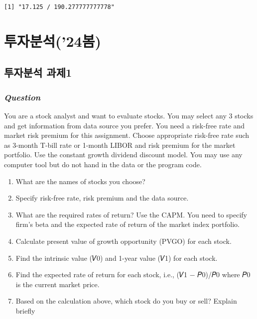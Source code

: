 \documentclass[
  letterpaper,
  DIV=11,
  numbers=noendperiod]{scrreprt}
\providecommand{\tightlist}{%
  \setlength{\itemsep}{0pt}\setlength{\parskip}{0pt}}\usepackage{longtable,booktabs,array}
\begin{document}
\begin{verbatim}
[1] "17.125 / 190.277777777778"
\end{verbatim}

\part{투자분석('24봄)}

\chapter*{투자분석 과제1}\label{uxd22cuxc790uxbd84uxc11d-uxacfcuxc81c1}


\section*{\texorpdfstring{\textbf{\emph{Question}}}{Question}}\label{question}


You are a stock analyst and want to evaluate stocks. You may select any
3 stocks and get information from data source you prefer. You need a
risk-free rate and market risk premium for this assignment. Choose
appropriate risk-free rate such as 3-month T-bill rate or 1-month LIBOR
and risk premium for the market portfolio. Use the constant growth
dividend discount model. You may use any computer tool but do not hand
in the data or the program code.

\begin{enumerate}
\def\labelenumi{\alph{enumi})}
\tightlist
\item
  What are the names of stocks you choose?
\item
  Specify risk-free rate, risk premium and the data source.
\item
  What are the required rates of return? Use the CAPM. You need to
  specify firm's beta and the expected rate of return of the market
  index portfolio.
\item
  Calculate present value of growth opportunity (PVGO) for each stock.
\item
  Find the intrinsic value (𝑉0) and 1-year value (𝑉1) for each stock.
\item
  Find the expected rate of return for each stock, i.e., (𝑉1 − 𝑃0)/𝑃0
  where 𝑃0 is the current market price.
\item
  Based on the calculation above, which stock do you buy or sell?
  Explain briefly
\end{enumerate}
\end{document}
